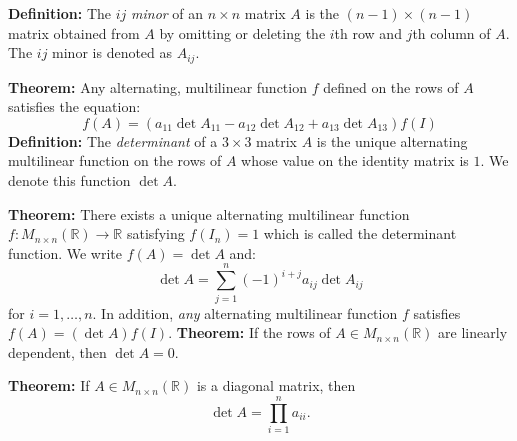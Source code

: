 \documentclass{article}
\begin{document}
\begin{minipage}[t]{0.45\linewidth}
        \textbf{Definition:} The $ij$ \textit{minor} of an $n\times n$ matrix $A$ is the $(n-1)\times (n-1)$ matrix obtained from $A$ by omitting or deleting the $i$th row and $j$th column of $A$. The $ij$ minor is denoted as $A_{ij}$.
        \vspace{2mm}

        \textbf{Theorem:} Any alternating, multilinear function $f$ defined on the rows of $A$ satisfies the equation:
        \begin{equation*}
            f\left(A\right) = (a_{11}\det A_{11} - a_{12}\det A_{12} + a_{13}\det A_{13})f(I)
        \end{equation*}
        \textbf{Definition:} The \textit{determinant} of a $3\times 3$ matrix $A$ is the unique alternating multilinear function on the rows of $A$ whose value on the identity matrix is $1$. We denote this function $\det A$.
        \vspace{2mm}

        \textbf{Theorem:} There exists a unique alternating multilinear function $f: M_{n\times n}(\mathbb{R}) \to \mathbb{R}$ satisfying $f(I_n)=1$ which is called the determinant function. We write $f(A) = \det A$ and:
        \begin{equation*}
            \det A = \sum_{j=1}^{n} (-1)^{i+j} a_{ij}\det A_{ij}
        \end{equation*}
        for $i=1,\dots,n$. In addition, \textit{any} alternating multilinear function $f$ satisfies $f(A) = (\det A)f(I)$. 
        \vspace{2mm}
        \textbf{Theorem:} If the rows of $A \in M_{n\times n}(\mathbb{R})$ are linearly dependent, then $\det A = 0.$
        \vspace{2mm}

        \textbf{Theorem:} If $A \in M_{n\times n}(\mathbb{R})$ is a diagonal matrix, then $$ \det A = \prod_{i=1}^n a_{ii}.$$
    \end{minipage}
    \newpage
\end{document}
